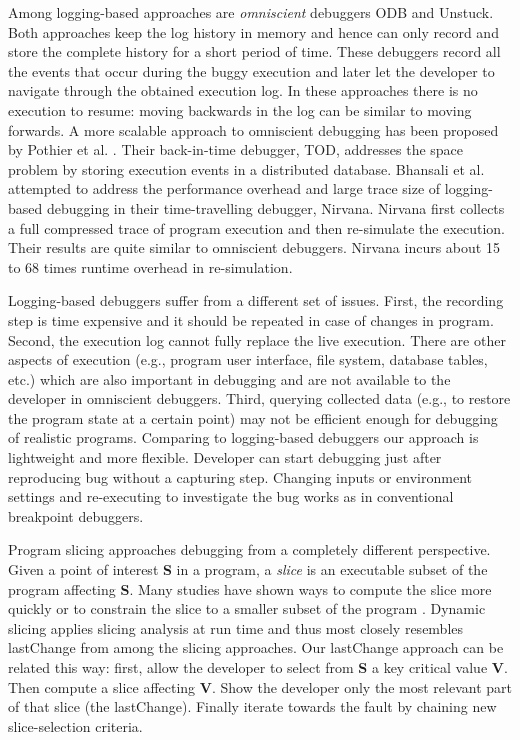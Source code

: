 \documentclass{sig-alternate}
\begin{document}
Among logging-based approaches are \textit{omniscient} debuggers
ODB\cite{Lewis} and Unstuck\cite{Hofer}. Both
approaches keep the log history in memory and hence can only record
and store the complete history for a short period of time. These
debuggers record all the events that occur during the buggy execution
and later let the developer to navigate through the obtained execution
log. In these approaches there is no execution to resume: moving
backwards in the log can be similar to moving forwards. A more scalable 
approach to omniscient debugging has been proposed by Pothier et al. \cite{Pothier}. 
Their back-in-time debugger, TOD, addresses the space problem by storing 
execution events in a distributed database. Bhansali et al. \cite{Bhansali} attempted to address the performance overhead 
and large trace size of logging-based debugging in their time-travelling debugger, Nirvana. 
Nirvana first collects a full compressed trace of program execution and then 
re-simulate the execution. Their results are quite similar to omniscient 
debuggers. Nirvana incurs about 15 to 68 times runtime overhead in 
re-simulation.


Logging-based debuggers suffer from a different set of issues. First, the recording
step is time expensive and it should be repeated in case of changes in
program. Second, the execution log cannot fully replace the live
execution. There are other aspects of execution (e.g., program user
interface, file system, database tables, etc.) which are also
important in debugging and are not available to the developer in
omniscient debuggers. Third, querying collected data (e.g., to restore
the program state at a certain point) may not be efficient enough for
debugging of realistic programs. Comparing to logging-based debuggers our approach is
lightweight and more flexible. Developer can start debugging just
after reproducing bug without a capturing step.  Changing inputs or
environment settings and re-executing to investigate the bug works as
in conventional breakpoint debuggers.


Program slicing\cite{Weiser} approaches debugging from a completely different perspective. Given a point of interest {\bf S} in a program, a \textit{slice} is an executable subset of the program affecting {\bf S}.  Many studies have shown ways to compute the slice more quickly or to constrain the slice to a smaller subset of the program \cite{Horwitz, Sridharan}.  Dynamic slicing \cite{Korel} applies slicing analysis at run time and thus most closely resembles lastChange from among the slicing approaches.  Our lastChange approach can be related this way: first, allow the developer to select from {\bf S} a key critical value {\bf V}. Then compute a slice affecting {\bf V}. Show the developer only the most relevant part of that slice (the lastChange). Finally iterate towards the fault by chaining new slice-selection criteria.
\end{document}
